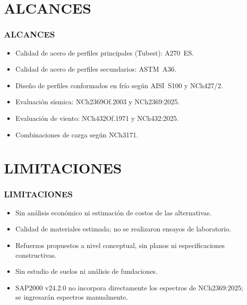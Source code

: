 \documentclass[11.5pt,aspectratio=169,handout]{beamer}
\newcommand{\ctitle}[1]{\frametitle{#1}}
\begin{document}
\section{ALCANCES}

\begin{frame}
\ctitle{ALCANCES}
\begin{itemize}\footnotesize\setlength{\itemsep}{2.5mm}
  \item Calidad de acero de perfiles principales (Tubest): \alert{A270~ES}.
  \item Calidad de acero de perfiles secundarios: \alert{ASTM~A36}.
  \item Diseño de perfiles conformados en frío según \alert{AISI~S100} y
        \alert{NCh427/2}.
  \item Evaluación sísmica: \alert{NCh2369Of.2003} y \alert{NCh2369:2025}.
  \item Evaluación de viento: \alert{NCh432Of.1971} y \alert{NCh432:2025}.
  \item Combinaciones de carga según \alert{NCh3171}.
\end{itemize}
\end{frame}

\section{LIMITACIONES}

\begin{frame}
\ctitle{LIMITACIONES}
\begin{itemize}\footnotesize\setlength{\itemsep}{2.5mm}
  \item Sin análisis económico ni estimación de costos de las alternativas.
  \item Calidad de materiales estimada; no se realizaron ensayos de
        laboratorio.
  \item Refuerzos propuestos a nivel conceptual, sin planos ni
        especificaciones constructivas.
  \item Sin estudio de suelos ni análisis de fundaciones.
  \item \alert{SAP2000 v24.2.0} no incorpora directamente los espectros
        de \alert{NCh2369:2025}; se ingresarán espectros manualmente.
\end{itemize}
\end{frame}
\end{document}
